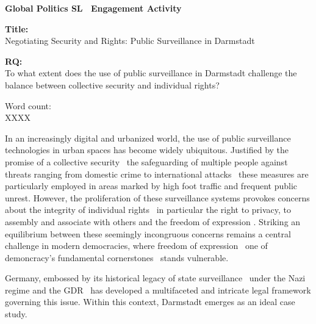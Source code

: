 \documentclass[12pt]{article}
\begin{document}
	
	\begin{titlepage}
		\centering
		
		\textbf{Global Politics SL \textemdash\ Engagement Activity}
		
		\vspace*{4cm}
		
		\textbf{Title:}\\
		Negotiating Security and Rights: Public Surveillance in Darmstadt
		
		\vspace{1cm}
		
		\textbf{RQ:}\\
		To what extent does the use of public surveillance in Darmstadt challenge the balance between collective security and individual rights?
		
		\vspace{4cm}
		
		Word count:\\
		XXXX
		
		\vfill
	\end{titlepage}
	
	
	In an increasingly digital and urbanized world, the use of public surveillance technologies in urban spaces has become widely ubiquitous. Justified by the promise of a collective security \textemdash\ the safeguarding of multiple people against threats ranging from domestic crime to international attacks \parencites{noauthor_security_2025}{noauthor_collective_2025} \textemdash\ these measures are particularly employed in areas marked by high foot traffic and frequent public unrest. However, the proliferation of these surveillance systems provokes concerns about the integrity of individual rights \textemdash\ in particular the right to privacy, to assembly and associate with others and the freedom of expression \parencite{nandy2023}. Striking an equilibrium between these seemingly incongruous concerns remains a central challenge in modern democracies, where freedom of expression \textemdash\ one of demoncracy's fundamental cornerstones \parencite{noauthor_special_nodate} \textemdash\ stands vulnerable. 
		
	Germany, embossed by its historical legacy of state surveillance \textemdash\ under the Nazi regime \parencite{mdrde_uberwachung_nodate} and the GDR \parencite{lichter_loeffler_siegloch2016} \textemdash\ has developed a multifaceted and intricate legal framework governing this issue. Within this context, Darmstadt emerges as an ideal case study.
	
\end{document}
